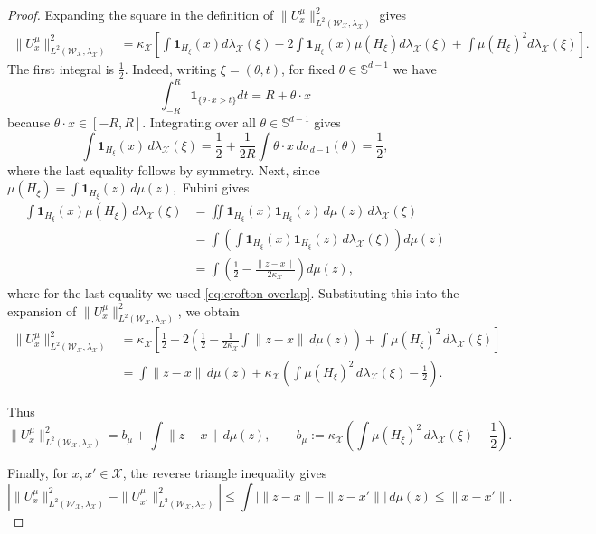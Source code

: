 \documentclass[11pt]{amsart}
\theoremstyle{definition}
\theoremstyle{remark}
\newcommand{\1}{\mathbf{1}}
\newcommand{\Sd}{\mathbb{S}}
\numberwithin{equation}{section}
\begin{document}
\begin{proof}
Expanding the square in the definition of $\|U_x^\mu\|^2_{L^2(\mathcal W_\mathcal X,\lambda_\mathcal X)}$ gives
\begin{align*}
\|U_x^\mu\|^2_{L^2(\mathcal W_\mathcal X,\lambda_\mathcal X)}
&=\kappa_{\mathcal X}\left[\int\1_{H_\xi}(x)d\lambda_{\mathcal X}(\xi)
 -2\int\1_{H_\xi}(x)\mu(H_\xi)d\lambda_{\mathcal X}(\xi)
 +\int \mu(H_\xi)^2d\lambda_{\mathcal X}(\xi)\right].
\end{align*}
The first integral is $\frac12$. Indeed, writing $\xi=(\theta,t)$, for
fixed $\theta\in \Sd^{d-1}$ we have
\[
\int_{-R}^{R}\mathbf 1_{\{\theta\cdot x>t\}}
dt
=R+\theta\cdot x
\]
because $\theta\cdot x\in[-R,R]$. Integrating over all $\theta \in \Sd^{d-1}$ gives
\begin{equation}\label{eq:1/2eq}
\int\mathbf 1_{H_\xi}(x)\,d\lambda_{\mathcal X}(\xi)
=
\frac12+
\frac{1}{2R}\int\theta\cdot x\,d\sigma_{d-1}(\theta)
=
\frac12,
\end{equation}
where the last equality follows by symmetry. Next, since
$\mu(H_\xi)=\int \mathbf 1_{H_\xi}(z)\,d\mu(z),$
Fubini gives
\begin{align*}
\int\mathbf 1_{H_\xi}(x)\mu(H_\xi)\,d\lambda_{\mathcal X}(\xi)
&=
\iint 
\mathbf 1_{H_\xi}(x)\mathbf 1_{H_\xi}(z)
\,d\mu(z)\,d\lambda_{\mathcal X}(\xi) \\
&=
\int 
\left(
\int
\mathbf 1_{H_\xi}(x)\mathbf 1_{H_\xi}(z)
\,d\lambda_{\mathcal X}(\xi)
\right)
d\mu(z) \\
&= \int 
\left(
\frac12-\frac{\|z-x\|}{2\kappa_{\mathcal X}}
\right)
d\mu(z),
\end{align*}
where for the last equality we used \eqref{eq:crofton-overlap}.
Substituting this into the expansion of $\|U_x^\mu\|^2_{L^2(\mathcal W_\mathcal X,\lambda_\mathcal X)}$, we obtain
\begin{align*}
\|U_x^\mu\|^2_{L^2(\mathcal W_\mathcal X,\lambda_\mathcal X)}
&= \kappa_{\mathcal X} \left[
\frac12
-
2\left(
\frac12-\frac{1}{2\kappa_{\mathcal X}}\int \|z-x\|\,d\mu(z)
\right)
+
\int\mu(H_\xi)^2\,d\lambda_{\mathcal X}(\xi)
\right] \\
&=
\int \|z-x\|\,d\mu(z)
+
\kappa_{\mathcal X}
\left(
\int\mu(H_\xi)^2\,d\lambda_{\mathcal X}(\xi)-\frac12
\right).
\end{align*}

Thus
\[
\|U_x^\mu\|^2_{L^2(\mathcal W_\mathcal X,\lambda_\mathcal X)}
=b_\mu+\int \|z-x\|\,d\mu(z),
\qquad
b_\mu
:=
\kappa_{\mathcal X}
\left(
\int\mu(H_\xi)^2\,d\lambda_{\mathcal X}(\xi)-\frac12
\right).
\]

Finally, for $x,x'\in \mathcal X$, the reverse triangle inequality gives 
\[
\left|
\|U_x^\mu\|^2_{L^2(\mathcal W_\mathcal X,\lambda_\mathcal X)}
-
\|U_{x'}^\mu\|^2_{L^2(\mathcal W_\mathcal X,\lambda_\mathcal X)}
\right| \le
\int \bigl|\|z-x\|-\|z-x'\|\bigr|\,d\mu(z)\le \|x-x'\|.
\]
\end{proof}
\end{document}
